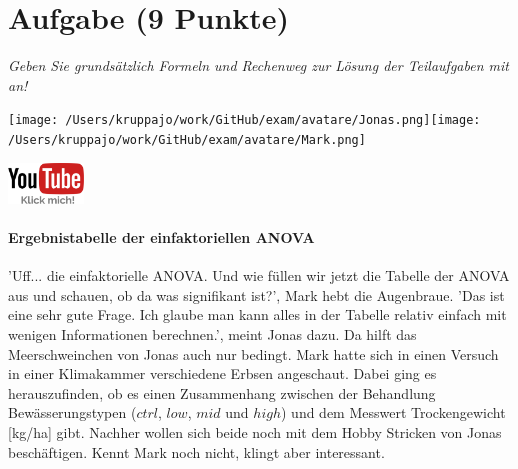 \documentclass[a4paper, 9pt]{scrartcl}\usepackage[]{graphicx}\usepackage[]{xcolor}
\begin{document}
\clearpage

\section{Aufgabe \hfill (9 Punkte)}

\textit{Geben Sie grundsätzlich Formeln und Rechenweg zur Lösung der Teilaufgaben mit an!} \\[1Ex]
 

 
\begin{minipage}[t]{0.5\textwidth}
\texttt{[image: /Users/kruppajo/work/GitHub/exam/avatare/Jonas.png]}\hspace{-4mm}\texttt{[image: /Users/kruppajo/work/GitHub/exam/avatare/Mark.png]}
\end{minipage}
\begin{minipage}[t]{0.5\textwidth}
\hfill
\href{https://youtu.be/IhecxMcCENY}{\includegraphics[width = 2cm]{img/youtube}}
\end{minipage}



\paragraph{Ergebnistabelle der einfaktoriellen ANOVA}

'Uff... die einfaktorielle ANOVA. Und wie füllen wir jetzt die Tabelle der ANOVA aus und schauen, ob da was signifikant ist?', Mark hebt die Augenbraue. 'Das ist eine sehr gute Frage. Ich glaube man kann alles in der Tabelle relativ einfach mit wenigen Informationen berechnen.', meint Jonas dazu. Da hilft das Meerschweinchen von Jonas auch nur bedingt. Mark hatte sich in einen Versuch in einer Klimakammer verschiedene Erbsen angeschaut. Dabei ging es herauszufinden, ob es einen Zusammenhang zwischen der Behandlung Bewässerungstypen ($ctrl$, $low$, $mid$ und $high$) und dem Messwert Trockengewicht [kg/ha] gibt. Nachher wollen sich beide noch mit dem Hobby Stricken von Jonas beschäftigen. Kennt Mark noch nicht, klingt aber interessant.
\end{document}
